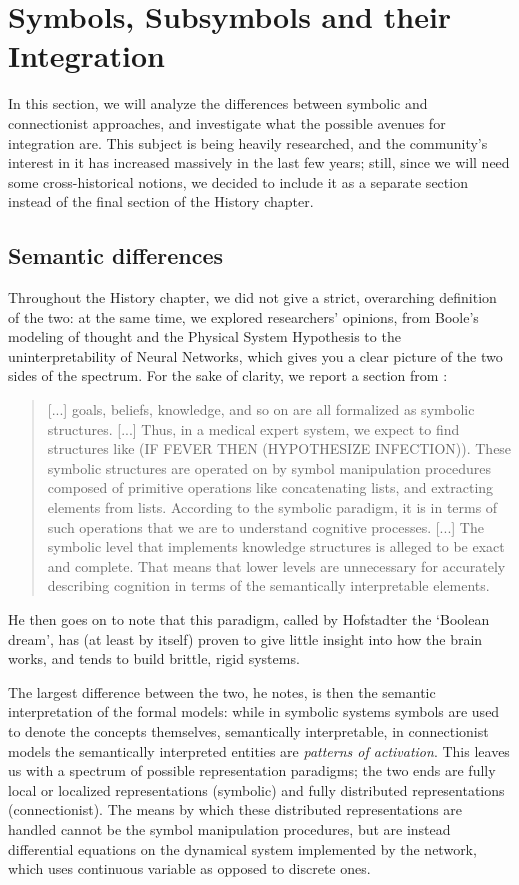 \documentclass[../main.tex]{subfiles}
\begin{document}
\section{Symbols, Subsymbols and their Integration}

In this section, we will analyze the differences between symbolic and connectionist approaches, and investigate what the possible avenues for integration are. This subject is being heavily researched, and the community's interest in it has increased massively in the last few years; still, since we will need some cross-historical notions, we decided to include it as a separate section instead of the final section of the History chapter.

\subsection{Semantic differences}
Throughout the History chapter, we did not give a strict, overarching definition of the two: at the same time, we explored researchers' opinions, from Boole's modeling of thought and the Physical System Hypothesis to the uninterpretability of Neural Networks, which gives you a clear picture of the two sides of the spectrum. For the sake of clarity, we report a section from  \parencite{smolenskyConnectionistAISymbolic1987}:
\begin{quote}
    [...] goals, beliefs, knowledge, and so on are all formalized as symbolic structures. [...] Thus, in a medical expert system, we expect to find structures like (IF FEVER THEN (HYPOTHESIZE INFECTION)). These symbolic structures are operated on by symbol manipulation procedures composed of primitive operations like concatenating lists, and extracting elements from lists. According to the symbolic paradigm, it is in terms of such operations that we are to understand cognitive processes. [...] The symbolic level that implements knowledge structures is alleged to be exact and complete. That means that lower levels are unnecessary for accurately describing cognition in terms of the semantically interpretable elements.
\end{quote}

He then goes on to note that this paradigm, called by Hofstadter the `Boolean dream', has (at least by itself) proven to give little insight into how the brain works, and tends to build brittle, rigid systems.

The largest difference between the two, he notes, is then the semantic interpretation of the formal models: while in symbolic systems symbols are used to denote the concepts themselves, semantically interpretable, in connectionist models the semantically interpreted entities are \textit{patterns of activation}. This leaves us with a spectrum of possible representation paradigms; the two ends are fully local or localized representations (symbolic) and fully distributed representations (connectionist). The means by which these distributed representations are handled cannot be the symbol manipulation procedures, but are instead differential equations on the dynamical system implemented by the network, which uses continuous variable as opposed to discrete ones.
\end{document}
